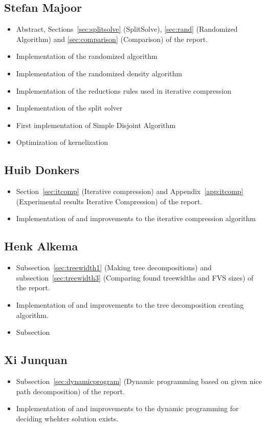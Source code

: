 \subsection{Stefan Majoor}
\begin{itemize}
 \item Abstract, Sections~\ref{sec:splitsolve} (SplitSolve), \ref{sec:rand} (Randomized Algorithm) and \ref{sec:comparison} (Comparison) of the report.
 \item Implementation of the randomized algorithm
 \item Implementation of the randomized density algorithm
 \item Implementation of the reductions rules used in iterative compression
 \item Implementation of the split solver
 \item First implementation of Simple Disjoint Algorithm
 \item Optimization of kernelization
\end{itemize}

\subsection{Huib Donkers}
\begin{itemize}
 \item Section~\ref{sec:itcomp} (Iterative compression) and Appendix~\ref{app:itcomp} (Experimental results Iterative Compression) of the report.
 \item Implementation of and improvements to the iterative compression algorithm
\end{itemize}

\subsection{Henk Alkema}
\begin{itemize}
 \item Subsection~\ref{sec:treewidth1} (Making tree decompositions) and subsection~\ref{sec:treewidth3} (Comparing found treewidths and FVS sizes) of the report.
 \item Implementation of and improvements to the tree decomposition creating algorithm.
 \item Subsection
\end{itemize}

\subsection{Xi Junquan}
\begin{itemize}
 \item Subsection~\ref{sec:dynamicprogram} (Dynamic programming based on given nice path decomposition) of the report.
 \item Implementation of and improvements to the dynamic programming for deciding whehter solution exists.
\end{itemize}

